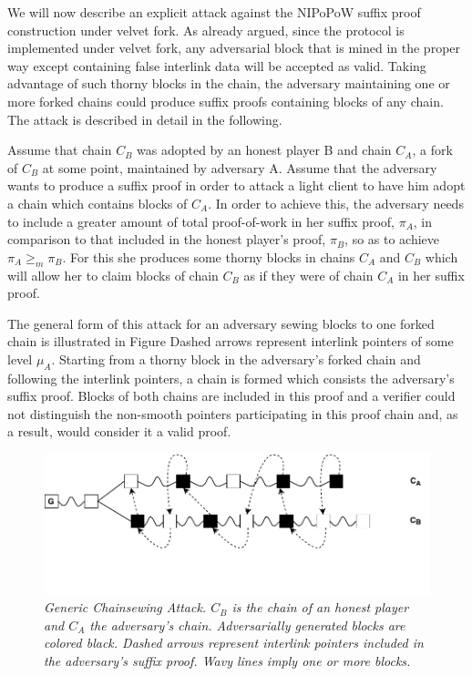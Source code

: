 We  will now describe an explicit attack against the NIPoPoW suffix proof construction under velvet fork. As already argued, since the protocol is implemented under velvet fork, any adversarial block that is mined in the proper way except
containing false interlink data will be accepted as valid. Taking advantage 
of such thorny blocks in the chain, the adversary maintaining one or more forked 
chains could produce suffix proofs containing blocks of any chain.
The attack is described in detail in the following.

Assume that chain $C_B$ was adopted by an honest player B and chain $C_A$, 
a fork of $C_B$ at some point, maintained by adversary A. Assume that the
adversary wants to produce a suffix  proof in order to attack a light client 
to have him adopt a chain which contains blocks of $C_A$. In order to achieve
this, the adversary needs to include a greater amount of total proof-of-work
in her suffix proof, $\pi_A$, in comparison to that included in the honest
player's proof, $\pi_B$, so as to achieve $\pi_A \geq_m \pi_B$. For this she
produces some thorny blocks in chains $C_A$ and $C_B$ which will allow her to
claim blocks of chain $C_B$ as if they were of chain $C_A$ in her suffix proof.

The general form of this attack for an adversary sewing blocks to one forked
chain is illustrated in Figure %
Dashed arrows
represent interlink pointers of some level $\mu_A$. Starting from a thorny
block in the adversary's forked chain and following the interlink pointers,
a chain is formed which consists the adversary's suffix proof. Blocks of 
both chains are included in this proof and a verifier could not distinguish 
the non-smooth pointers participating in this proof chain and, as a result,
would consider it a valid proof.

\begin{figure}[h]
	\begin{center}
		\includegraphics[scale=0.6]{figures/generic_chainsewing_attack.pdf}
	\end{center}
	\caption{\textit{Generic Chainsewing Attack. $C_B$ is the chain of an honest
	player and $C_A$ the adversary's chain. Adversarially generated blocks are
	colored black. Dashed arrows represent interlink pointers included in the 
	adversary's suffix proof. Wavy lines imply one or more blocks.}}
	\label{fig:generic_attack}
\end{figure}

